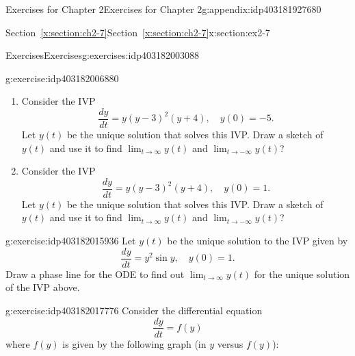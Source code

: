 \documentclass[oneside,10pt,]{book}
\newcommand{\xreffont}{\relax}
\numberwithin{equation}{section}
\numberwithin{equation}{section}
\begin{document}
\begin{appendixptx}{Exercises for Chapter 2}{}{Exercises for Chapter 2}{}{}{g:appendix:idp403181927680}
\begin{sectionptx}{Section~{\xreffont\ref*{x:section:ch2-7}}}{}{Section~{\xreffont\ref*{x:section:ch2-7}}}{}{}{x:section:ex2-7}
\begin{exercises-subsection-numberless}{Exercises}{}{Exercises}{}{}{g:exercises:idp403182003088}
\begin{divisionexercise}{2}{}{}{g:exercise:idp403182006880}
\begin{enumerate}[label=(\alph*)]
\item{}Consider the IVP%
\begin{equation*}
\frac{dy}{dt}=y\left(y-3\right)^{2}\left(y+4\right),\,\,\,\,\,\,y(0)=-5.
\end{equation*}
Let \(y(t)\) be the unique solution that solves this IVP. Draw a sketch of \(y(t)\) and use it to find \(\lim_{t\to\infty}y(t)\) and \(\lim_{t\to-\infty}y(t)\)?%
\item{}Consider the IVP%
\begin{equation*}
\frac{dy}{dt}=y\left(y-3\right)^{2}\left(y+4\right),\,\,\,\,\,\,y(0)=1.
\end{equation*}
Let \(y(t)\) be the unique solution that solves this IVP. Draw a sketch of \(y(t)\) and use it to find \(\lim_{t\to\infty}y(t)\) and \(\lim_{t\to-\infty}y(t)\)?%
\end{enumerate}
\end{divisionexercise}%
\begin{divisionexercise}{3}{}{}{g:exercise:idp403182015936}%
Let \(y(t)\) be the unique solution to the IVP given by%
\begin{equation*}
\frac{dy}{dt}=y^{2}\sin y,\,\,\,\,\,\,y(0)=1.
\end{equation*}
Draw a phase line for the ODE to find out \(\lim_{t\to\infty}y(t)\) for the unique solution of the IVP above.%
\end{divisionexercise}%
\begin{divisionexercise}{4}{}{}{g:exercise:idp403182017776}%
Consider the differential equation%
\begin{equation*}
\frac{dy}{dt}=f\left(y\right)
\end{equation*}
where \(f(y)\) is given by the following graph (in \(y\) versus \(f(y)\)):%
\begin{image}{0}{1}{0}%

\end{image}
\end{divisionexercise}
\end{exercises-subsection-numberless}
\end{sectionptx}
\end{appendixptx}
\end{document}
